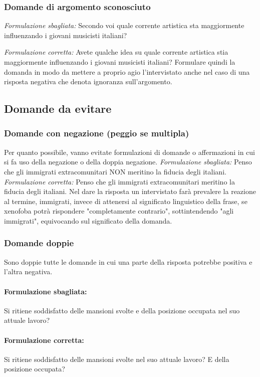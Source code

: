 \subsubsection{Domande di argomento sconosciuto}

\textit{Formulazione sbagliata:} Secondo voi quale corrente artistica sta maggiormente influenzando i giovani musicisti italiani? 

\textit{Formulazione corretta:} Avete qualche idea su quale corrente artistica stia maggiormente influenzando i giovani musicisti italiani? \newline
Formulare quindi la domanda in modo da mettere a proprio agio l'intervistato anche nel caso di una risposta negativa che denota ignoranza sull'argomento.

\subsection{Domande da evitare}
\subsubsection{Domande con negazione (peggio se multipla)}
Per quanto possibile, vanno evitate formulazioni di domande o affermazioni in cui si fa uso della negazione o della doppia negazione.
\textit{Formulazione sbagliata:} Penso che gli immigrati extracomunitari NON meritino la fiducia degli italiani.
\textit{Formulazione corretta:}
Penso che gli immigrati extracomunitari meritino la fiducia degli italiani. \newline
Nel dare la risposta un intervistato farà prevalere la reazione al termine, immigrati, invece di attenersi al significato linguistico della frase, se xenofoba potrà rispondere "completamente contrario", sottintendendo "agli immigrati", equivocando sul significato della domanda.

\subsubsection{Domande doppie}
Sono doppie tutte le domande in cui una parte della risposta potrebbe positiva e l’altra negativa.
\paragraph{Formulazione sbagliata:} Si ritiene soddisfatto delle mansioni svolte e della posizione occupata nel suo attuale lavoro?
\paragraph{Formulazione corretta:} Si ritiene soddisfatto delle mansioni svolte nel suo attuale lavoro? E della posizione occupata?

